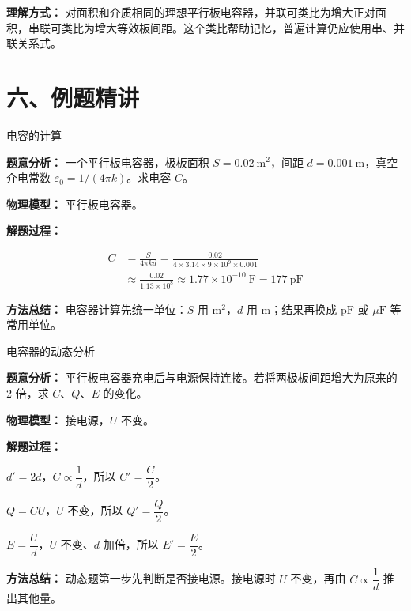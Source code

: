 \textbf{理解方式：} 对面积和介质相同的理想平行板电容器，并联可类比为增大正对面积，串联可类比为增大等效板间距。这个类比帮助记忆，普遍计算仍应使用串、并联关系式。

\pagebreak[3]
\section*{六、例题精讲}

\begin{examplebox}{电容的计算}

\textbf{题意分析：} 一个平行板电容器，极板面积 $S = 0.02\ \mathrm{m^2}$，间距 $d = 0.001\ \mathrm{m}$，真空介电常数 $\varepsilon_0 = 1/(4\pi k)$。求电容 $C$。

\textbf{物理模型：} 平行板电容器。

\textbf{解题过程：}

\[
\begin{aligned}
C &= \frac{S}{4\pi k d}
 = \frac{0.02}{4 \times 3.14 \times 9 \times 10^9 \times 0.001} \\
&\approx \frac{0.02}{1.13 \times 10^8}
 \approx 1.77 \times 10^{-10}\ \mathrm{F}
 = 177\ \mathrm{pF}
\end{aligned}
\]

\textbf{方法总结：} 电容器计算先统一单位：$S$ 用 $\mathrm{m^2}$，$d$ 用 $\mathrm{m}$；结果再换成 $\mathrm{pF}$ 或 $\mu\mathrm{F}$ 等常用单位。

\end{examplebox}

\begin{examplebox}{电容器的动态分析}

\textbf{题意分析：} 平行板电容器充电后与电源保持连接。若将两极板间距增大为原来的 2 倍，求 $C$、$Q$、$E$ 的变化。

\textbf{物理模型：} 接电源，$U$ 不变。

\textbf{解题过程：}

$d' = 2d$，$C \propto \dfrac{1}{d}$，所以 $C' = \dfrac{C}{2}$。

$Q = CU$，$U$ 不变，所以 $Q' = \dfrac{Q}{2}$。

$E = \dfrac{U}{d}$，$U$ 不变、$d$ 加倍，所以 $E' = \dfrac{E}{2}$。

\textbf{方法总结：} 动态题第一步先判断是否接电源。接电源时 $U$ 不变，再由 $C \propto \dfrac{1}{d}$ 推出其他量。

\end{examplebox}

